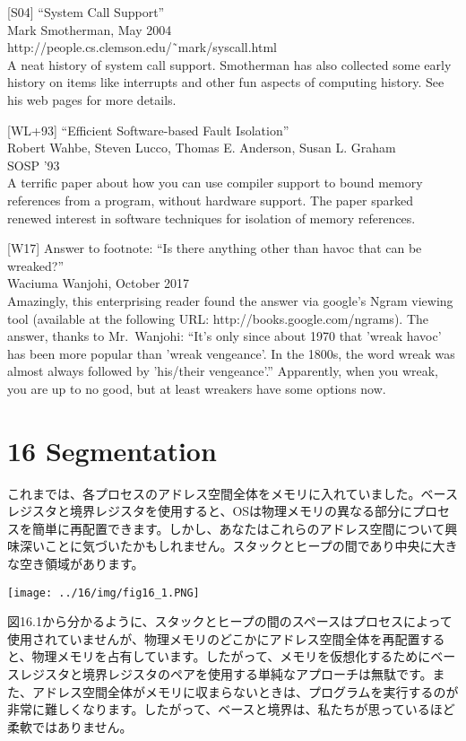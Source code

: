 {[}S04{]} ``System Call Support''\\
Mark Smotherman, May 2004\\
http://people.cs.clemson.edu/˜mark/syscall.html\\
A neat history of system call support. Smotherman has also collected
some early history on items like interrupts and other fun aspects of
computing history. See his web pages for more details.

{[}WL+93{]} ``Efficient Software-based Fault Isolation''\\
Robert Wahbe, Steven Lucco, Thomas E. Anderson, Susan L. Graham\\
SOSP '93\\
A terrific paper about how you can use compiler support to bound memory
references from a program, without hardware support. The paper sparked
renewed interest in software techniques for isolation of memory
references.

{[}W17{]} Answer to footnote: ``Is there anything other than havoc that
can be wreaked?''\\
Waciuma Wanjohi, October 2017\\
Amazingly, this enterprising reader found the answer via google's Ngram
viewing tool (available at the following URL:
http://books.google.com/ngrams). The answer, thanks to Mr.~Wanjohi:
``It's only since about 1970 that 'wreak havoc' has been more popular
than 'wreak vengeance'. In the 1800s, the word wreak was almost always
followed by 'his/their vengeance'.'' Apparently, when you wreak, you are
up to no good, but at least wreakers have some options now.

\hypertarget{segmentation}{%
\section*{16 Segmentation}\label{segmentation}}

これまでは、各プロセスのアドレス空間全体をメモリに入れていました。ベースレジスタと境界レジスタを使用すると、OSは物理メモリの異なる部分にプロセスを簡単に再配置できます。しかし、あなたはこれらのアドレス空間について興味深いことに気づいたかもしれません。スタックとヒープの間であり中央に大きな空き領域があります。

\texttt{[image: ../16/img/fig16\_1.PNG]}

図16.1から分かるように、スタックとヒープの間のスペースはプロセスによって使用されていませんが、物理メモリのどこかにアドレス空間全体を再配置すると、物理メモリを占有しています。したがって、メモリを仮想化するためにベースレジスタと境界レジスタのペアを使用する単純なアプローチは無駄です。また、アドレス空間全体がメモリに収まらないときは、プログラムを実行するのが非常に難しくなります。したがって、ベースと境界は、私たちが思っているほど柔軟ではありません。

